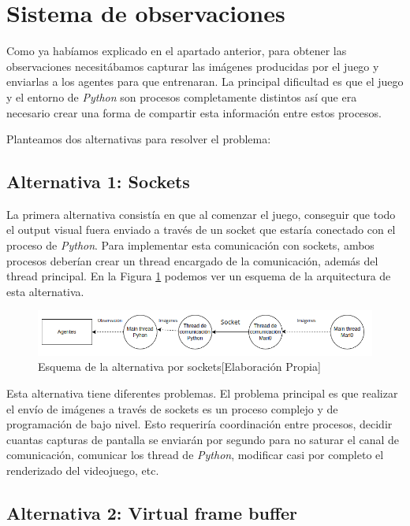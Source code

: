 \section{Sistema de observaciones}

Como ya habíamos explicado en el apartado anterior, para obtener las observaciones necesitábamos capturar las imágenes producidas por el juego y enviarlas a los agentes para que entrenaran. La principal dificultad es que el juego y el entorno de \textit{Python} son procesos completamente distintos así que era necesario crear una forma de compartir esta información entre estos procesos.

Planteamos dos alternativas para resolver el problema:

\subsection*{Alternativa 1: Sockets}

La primera alternativa consistía en que al comenzar el juego, conseguir que todo el output visual fuera enviado a través de un socket que estaría conectado con el proceso de \textit{Python}. Para implementar esta comunicación con sockets, ambos procesos deberían crear un thread encargado de la comunicación, además del thread principal. En la Figura \ref {fig:alternativa-1-com} podemos ver un esquema de la arquitectura de esta alternativa.
\begin{figure}[ht]
    \centering
    \includegraphics[width=1.0\textwidth]{img/Observations-1.png}
    \caption{Esquema de la alternativa por sockets[Elaboración Propia]}
    \label{fig:alternativa-1-com}
\end{figure}

Esta alternativa tiene diferentes problemas. El problema principal es que realizar el envío de imágenes a través de sockets es un proceso complejo y de programación de bajo nivel. Esto requeriría coordinación entre procesos, decidir cuantas capturas de pantalla se enviarán por segundo para no saturar el canal de comunicación, comunicar los thread de \textit{Python}, modificar casi por completo el renderizado del videojuego, etc.

\subsection*{Alternativa 2: Virtual frame buffer}

